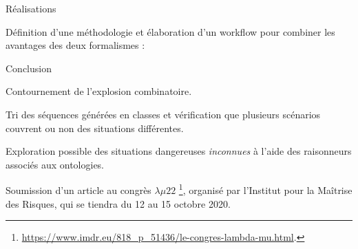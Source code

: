 \documentclass[
  hyperref={
    pdfusetitle,
    pdfencoding=auto,
    psdextra,
    colorlinks=true,
    linkcolor=darkblue,
    citecolor=darkred,
    urlcolor=darkblue,
  },
  9pt,
  aspectratio=169,
]{beamer}
\begin{document}
\begin{frame}[allowframebreaks]{Réalisations}


  Définition d'une méthodologie et élaboration d'un workflow
  pour combiner les avantages des deux formalismes :

  \vspace{1cm}

  \begin{figure}[htb]
    \centering
    \begin{large}
      \begin{tikzpicture}
        
      \end{tikzpicture}
    \end{large}
  \end{figure}

  \alert{Conclusion}

  Contournement de l'explosion combinatoire.

  Tri des séquences générées en classes
  et vérification que plusieurs scénarios couvrent ou non
  des situations différentes.

  Exploration possible des situations dangereuses \emph{inconnues}
  à l'aide des raisonneurs associés aux ontologies.

  Soumission d'un article
  au congrès \( \lambda \mu 22 \)%
  \footnote{\url{https://www.imdr.eu/818_p_51436/le-congres-lambda-mu.html}.},
  organisé par l'Institut pour la Maîtrise des Risques,
  qui se tiendra du \num{12} au \num{15} octobre \num{2020}.

\end{frame}
\end{document}
